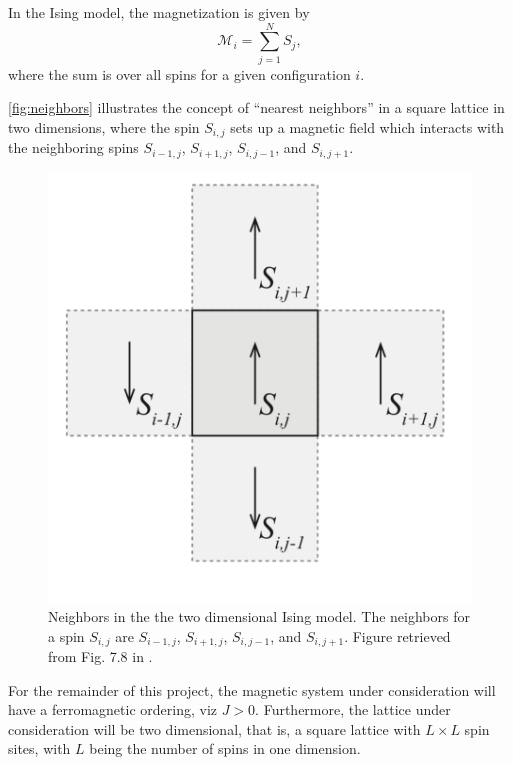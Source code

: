 In the Ising model, the magnetization is given by \cite[p. 423]{MHJ}
\begin{equation}\label{eq:ising mag}
    \mathcal{M}_i = \sum_{j=1}^N S_j,
\end{equation}
where the sum is over all spins for a given configuration $i$.

\autoref{fig:neighbors} illustrates the concept of “nearest neighbors” in a square lattice in two dimensions, where the spin $S_{i,j}$ sets up a magnetic field which interacts with the neighboring spins $S_{i-1,j}$, $S_{i+1,j}$, $S_{i,j-1}$, and $S_{i,j+1}$.
\begin{figure}[H]
    \begin{minipage}[c]{0.4\textwidth}
    \caption{Neighbors in the the two dimensional Ising model. The neighbors for a spin $S_{i,j}$ are $S_{i-1,j}$, $S_{i+1,j}$, $S_{i,j-1}$, and $S_{i,j+1}$. Figure retrieved from Fig. 7.8 in \cite{Malthe}.} 
    \label{fig:neighbors}
    \end{minipage}\hfill
  \begin{minipage}[c]{0.4\textwidth}
    \includegraphics[scale=0.35]{./Images/lattice}
  \end{minipage}
\end{figure}

For the remainder of this project, the magnetic system under consideration will have a ferromagnetic ordering, viz $J>0$. Furthermore, the lattice under consideration will be two dimensional, that is, a square lattice with $L \times L$ spin sites, with $L$ being the number of spins in one dimension.

